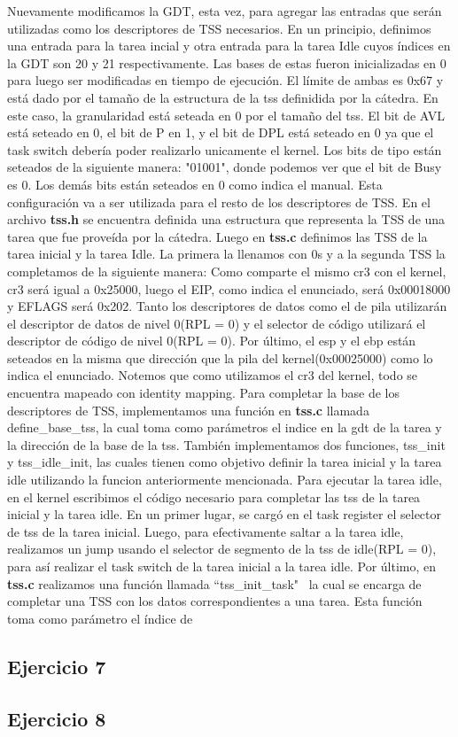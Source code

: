 \documentclass[a4paper]{article}
\begin{document}
\justify
Nuevamente modificamos la GDT, esta vez, para agregar las entradas que serán utilizadas como los descriptores de TSS necesarios. En un principio, definimos una entrada para la tarea incial y otra entrada para la tarea Idle cuyos índices en la GDT son 20 y 21 respectivamente. Las bases de estas fueron inicializadas en 0 para luego ser modificadas en tiempo de ejecución. El límite de ambas es 0x67 y está dado por el tamaño de la estructura de la tss definidida por la cátedra. En este caso, la granularidad está seteada en 0 por el tamaño del tss. El bit de AVL está seteado en 0, el bit de P en 1, y el bit de DPL está seteado en 0 ya que el task switch debería poder realizarlo unicamente el kernel. Los bits de tipo están seteados de la siguiente manera: "01001", donde podemos ver que el bit de Busy es 0. Los demás bits están seteados en 0 como indica el manual. Esta configuración va a ser utilizada para el resto de los descriptores de TSS.
\justify
En el archivo \textbf{tss.h} se encuentra definida una estructura que representa la TSS de una tarea que fue proveída por la cátedra. Luego en \textbf{tss.c} definimos las TSS de la tarea inicial y la tarea Idle. La primera la llenamos con 0s y a la segunda TSS la completamos de la siguiente manera: Como comparte el mismo cr3 con el kernel, cr3 será igual a 0x25000, luego el EIP, como indica el enunciado, será 0x00018000 y EFLAGS será 0x202. Tanto los descriptores de datos como el de pila utilizarán el descriptor de datos de nivel 0(RPL = 0) y el selector de código utilizará el descriptor de código de nivel 0(RPL = 0). Por último, el esp y el ebp están seteados en la misma que dirección que la pila del kernel(0x00025000) como lo indica el enunciado. Notemos que como utilizamos el cr3 del kernel, todo se encuentra mapeado con identity mapping.
\justify
Para completar la base de los descriptores de TSS, implementamos una función en \textbf{tss.c} llamada define_base_tss, la cual toma como parámetros el indice en la gdt de la tarea y la dirección de la base de la tss. También implementamos dos funciones, tss_init y tss_idle_init, las cuales tienen como objetivo definir la tarea inicial y la tarea idle utilizando la funcion anteriormente mencionada.
\justify
Para ejecutar la tarea idle, en el kernel escribimos el código necesario para completar las tss de la tarea inicial y la tarea idle. En un primer lugar, se cargó en el task register el selector de tss de la tarea inicial. Luego, para efectivamente saltar a la tarea idle, realizamos un jump usando el selector de segmento de la tss de idle(RPL = 0), para así realizar el task switch de la tarea inicial a la tarea idle.
\justify
Por último, en \textbf{tss.c} realizamos una función llamada ``tss_init_task" \ la cual se encarga de completar una TSS con los datos correspondientes a una tarea. Esta función toma como parámetro el índice de 

\subsection{Ejercicio 7}
\subsection{Ejercicio 8}
\end{document}
